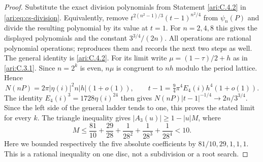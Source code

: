 \begin{proof}
Substitute the exact division polynomials from Statement \ref{ari:C.4.2}
in \eqref{ari:eq:cs-division}. Equivalently, remove
$t^{2(n^2-1)/3}(t-1)^{n^2/4}$ from $\psi_n(P)$ and divide
the resulting polynomial by its value at $t=1$. For $n=2,4,8$
this gives the displayed polynomials and the constant
$3^{3/4}/(2n)$. All operations are rational polynomial operations;
 reproduces them and records
the next two steps as well. The general identity is \ref{ari:C.4.2}.
For its limit write $\mu=(1-\tau)/2+h$ as in \ref{ari:C.3.1}. Since
$n=2^k$ is even, $n\mu$ is congruent to $nh$ modulo the
period lattice. Hence
\[
 N(nP)=2\pi|\eta(i)|^2 n|h|(1+o(1)),\qquad
 t-1=\tfrac94\pi^4E_4(i)h^4(1+o(1)).
\]
The identity $E_4(i)^3=1728\eta(i)^{24}$ then gives
$N(nP)|t-1|^{-1/4}\to2n/3^{3/4}$.
Since the left side of the general ladder tends to one,
this proves the stated limit for every $k$.
The triangle inequality gives
$|A_3(u)|\ge1-|u|M$, where
\[
 M\le\frac{81}{10}+\frac{29}{28}
                +\frac1{28^2}+\frac1{28^3}+\frac1{28^4}<10.
\]
Here we bounded respectively the five absolute coefficients by
$81/10,29,1,1,1$. This is a rational inequality on one disc,
not a subdivision or a root search.
\end{proof}

